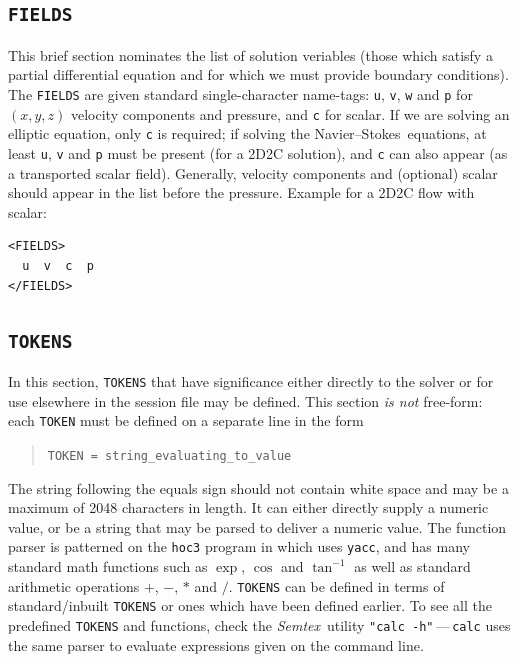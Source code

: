 \documentclass[11pt]{report}
\newcommand{\Semtex}{\emph{Semtex}} \newcommand{\Dog}{\emph{Dog}}
\newcommand\NavSto{Navier--Stokes}
\begin{document}
\subsection{\texttt{FIELDS}}
\label{sec.fields}


This brief section nominates the list of solution veriables (\ie those
which satisfy a partial differential equation and for which we must
provide boundary conditions).  The \verb|FIELDS| are given standard
single-character name-tags: \verb|u|, \verb|v|, \verb|w| and \verb|p|
for $(x,y,z)$ velocity components and pressure, and \verb|c| for
scalar.  If we are solving an elliptic equation, only \verb|c| is
required; if solving the \NavSto\ equations, at least \verb|u|,
\verb|v| and \verb|p| must be present (for a 2D2C solution), and
\verb|c| can also appear (as a transported scalar field).  Generally,
velocity components and (optional) scalar should appear in the list
before the pressure. Example for a 2D2C flow with scalar:
%
{\small
\begin{verbatim}
<FIELDS>
  u  v  c  p
</FIELDS>
\end{verbatim}
}

\subsection{\texttt{TOKENS}}
\label{sec.tokens}

In this section, \verb|TOKENS| that have significance either directly
to the solver or for use elsewhere in the session file may be defined.
This section \emph{is not} free-form: each \verb|TOKEN| must be
defined on a separate line in the form
\begin{quote}
  \verb|TOKEN = string_evaluating_to_value|
\end{quote}
The string following the equals sign should not contain white space
and may be a maximum of 2048 characters in length.  It can either
directly supply a numeric value, or be a string that may be parsed to
deliver a numeric value.  The function parser is patterned on the
\verb|hoc3| program in \citet{kernighan84} which uses \verb|yacc|, and
has many standard math functions such as $\exp$, $\cos$ and
$\tan^{-1}$ as well as standard arithmetic operations $+$, $-$, $\ast$
and $/$.  \verb|TOKENS| can be defined in terms of standard/inbuilt
\verb|TOKENS| or ones which have been defined earlier.  To see all the
predefined \verb|TOKENS| and functions, check the \Semtex\ utility
\verb|"calc -h"|\,---\,\verb|calc| uses the same parser to evaluate
expressions given on the command line.
\end{document}
